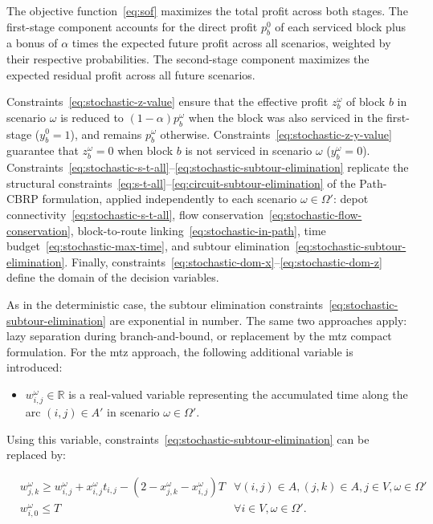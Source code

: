 The objective function~\eqref{eq:sof} maximizes the total profit across both
stages. The first-stage component accounts for the direct profit $p_{b}^{0}$ of
each serviced block plus a bonus of $\alpha$ times the expected future profit
across all scenarios, weighted by their respective probabilities. The
second-stage component maximizes the expected residual profit across all future
scenarios.

Constraints~\eqref{eq:stochastic-z-value} ensure that the effective profit
$z_{b}^{\omega}$ of block $b$ in scenario $\omega$ is reduced to $(1 -
	\alpha)p_{b}^{\omega}$ when the block was also serviced in the first-stage
($y_{b}^{0} = 1$), and remains $p_{b}^{\omega}$ otherwise.
Constraints~\eqref{eq:stochastic-z-y-value} guarantee that $z_{b}^{\omega} = 0$
when block $b$ is not serviced in scenario $\omega$ ($y_{b}^{\omega} = 0$).
Constraints~\eqref{eq:stochastic-s-t-all}--\eqref{eq:stochastic-subtour-elimination}
replicate the structural
constraints~\eqref{eq:s-t-all}--\eqref{eq:circuit-subtour-elimination} of the
Path-CBRP formulation, applied independently to each scenario $\omega \in
	\Omega'$: depot connectivity~\eqref{eq:stochastic-s-t-all}, flow
conservation~\eqref{eq:stochastic-flow-conservation}, block-to-route
linking~\eqref{eq:stochastic-in-path}, time
budget~\eqref{eq:stochastic-max-time}, and subtour
elimination~\eqref{eq:stochastic-subtour-elimination}. Finally,
constraints~\eqref{eq:stochastic-dom-x}--\eqref{eq:stochastic-dom-z} define the
domain of the decision variables.

As in the deterministic case, the subtour elimination
constraints~\eqref{eq:stochastic-subtour-elimination} are exponential in number.
The same two approaches apply: lazy separation during branch-and-bound, or
replacement by the \gls{mtz} compact formulation. For the \gls{mtz} approach,
the following additional variable is introduced:

\begin{itemize}
	\item $w_{i,j}^{\omega} \in \mathbb{R}$ is a real-valued variable
	      representing the accumulated time along the arc $(i, j) \in A'$ in
	      scenario $\omega \in \Omega'$.
\end{itemize}

Using this variable, constraints~\eqref{eq:stochastic-subtour-elimination} can
be replaced by:

\begin{align}
	 & w_{j,k}^{\omega} \geq w_{i,j}^{\omega} + x_{i,j}^{\omega}t_{i,j} - (2 - x_{j,k}^{\omega} - x_{i,j}^{\omega})T & \forall (i, j) \in A, (j, k) \in A, j \in V, \omega \in \Omega' \label{eq:stochastic-mtz-leq} \\
	 & w_{i,0}^{\omega} \leq T                                                                                       & \forall i \in V, \omega \in \Omega'.                              \label{eq:stochastic-mtz}
\end{align}

